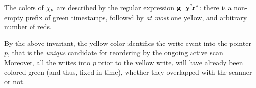 
\begin{invariant}[Colors]\label{inv:color}%
The colors of $\chi_p$ are described by the regular expression ${\mathbf{{g^{+}}{y^{?}}{r^{*}}}}$:
there is a non-empty prefix of green timestamps, followed by \emph{at
  most} one yellow, and arbitrary number of reds.
\end{invariant}

By the above invariant, the yellow color identifies the write event
into the pointer $p$, that is the \emph{unique} candidate for
reordering by the ongoing active scan. Moreover, all the writes into
$p$ prior to the yellow write, will have already been colored green
(and thus, fixed in time), whether they overlapped with the scanner or
not.


